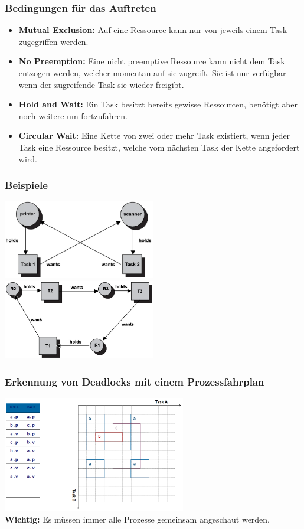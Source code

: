 \subsubsection{Bedingungen für das Auftreten}
\begin{itemize}
    \item \textbf{Mutual Exclusion:} Auf eine Ressource kann nur von jeweils einem Task zugegriffen werden.
    \item \textbf{No Preemption:} Eine nicht preemptive Ressource kann nicht dem Task entzogen werden, welcher momentan auf sie zugreift. Sie ist nur verfügbar wenn der zugreifende Task sie wieder freigibt.
    \item \textbf{Hold and Wait:} Ein Task besitzt bereits gewisse Ressourcen, benötigt aber noch weitere um fortzufahren.
    \item \textbf{Circular Wait:} Eine Kette von zwei oder mehr Task existiert, wenn jeder Task eine Ressource besitzt, welche vom nächsten Task der Kette angefordert wird.
\end{itemize}

\subsubsection{Beispiele}
\begin{multicols}{2}
    \includegraphics[width=0.5\textwidth]{images/Betriebssysteme/deadlock_2.png}
    \includegraphics[width=0.5\textwidth]{images/Betriebssysteme/deadlock_3.png}
\end{multicols}

\subsubsection{Erkennung von Deadlocks mit einem Prozessfahrplan}
\includegraphics[width=0.6\textwidth]{images/Betriebssysteme/fahrplan.png} \\
\textbf{Wichtig:} Es müssen immer alle Prozesse gemeinsam angeschaut werden. 


